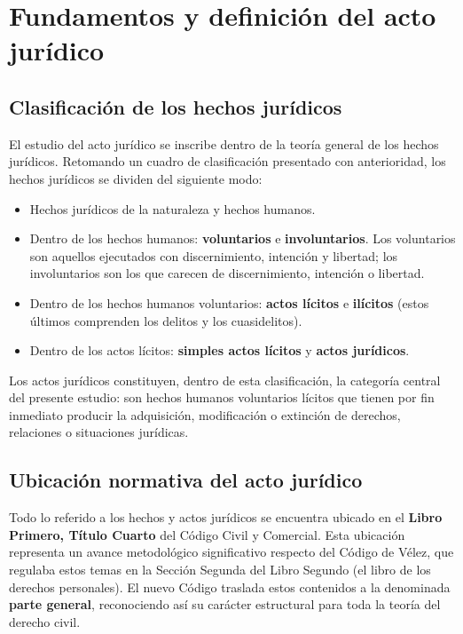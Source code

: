 \documentclass[12pt,oneside]{book}
\begin{document}

\chapter{Fundamentos y definición del acto jurídico}

\section{Clasificación de los hechos jurídicos}

El estudio del acto jurídico se inscribe dentro de la teoría general de los hechos jurídicos. Retomando un cuadro de clasificación presentado con anterioridad, los hechos jurídicos se dividen del siguiente modo:

\begin{itemize}
    \item Hechos jurídicos de la naturaleza y hechos humanos.
    \item Dentro de los hechos humanos: \textbf{voluntarios} e \textbf{involuntarios}. Los voluntarios son aquellos ejecutados con discernimiento, intención y libertad; los involuntarios son los que carecen de discernimiento, intención o libertad.
    \item Dentro de los hechos humanos voluntarios: \textbf{actos lícitos} e \textbf{ilícitos} (estos últimos comprenden los delitos y los cuasidelitos).
    \item Dentro de los actos lícitos: \textbf{simples actos lícitos} y \textbf{actos jurídicos}.
\end{itemize}

Los actos jurídicos constituyen, dentro de esta clasificación, la categoría central del presente estudio: son hechos humanos voluntarios lícitos que tienen por fin inmediato producir la adquisición, modificación o extinción de derechos, relaciones o situaciones jurídicas.

\section{Ubicación normativa del acto jurídico}

Todo lo referido a los hechos y actos jurídicos se encuentra ubicado en el \textbf{Libro Primero, Título Cuarto} del Código Civil y Comercial. Esta ubicación representa un avance metodológico significativo respecto del Código de Vélez, que regulaba estos temas en la Sección Segunda del Libro Segundo (el libro de los derechos personales). El nuevo Código traslada estos contenidos a la denominada \textbf{parte general}, reconociendo así su carácter estructural para toda la teoría del derecho civil.
\end{document}
